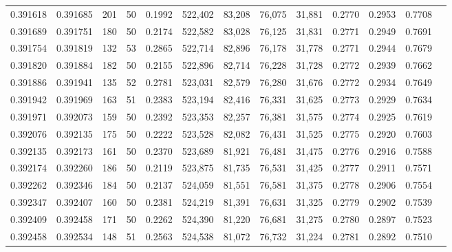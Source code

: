 \begin{tabular}{rrrrrrrrrrrrr}
0.391618 & 0.391685 &   201 &  50 &                                     0.1992 & 522,402 &  83,208 &  76,075 &  31,881 & 0.2770 & 0.2953 & 0.7708 \\
0.391689 & 0.391751 &   180 &  50 &                                     0.2174 & 522,582 &  83,028 &  76,125 &  31,831 & 0.2771 & 0.2949 & 0.7691 \\
0.391754 & 0.391819 &   132 &  53 &                                     0.2865 & 522,714 &  82,896 &  76,178 &  31,778 & 0.2771 & 0.2944 & 0.7679 \\
0.391820 & 0.391884 &   182 &  50 &                                     0.2155 & 522,896 &  82,714 &  76,228 &  31,728 & 0.2772 & 0.2939 & 0.7662 \\
0.391886 & 0.391941 &   135 &  52 &                                     0.2781 & 523,031 &  82,579 &  76,280 &  31,676 & 0.2772 & 0.2934 & 0.7649 \\
0.391942 & 0.391969 &   163 &  51 &                                     0.2383 & 523,194 &  82,416 &  76,331 &  31,625 & 0.2773 & 0.2929 & 0.7634 \\
0.391971 & 0.392073 &   159 &  50 &                                     0.2392 & 523,353 &  82,257 &  76,381 &  31,575 & 0.2774 & 0.2925 & 0.7619 \\
0.392076 & 0.392135 &   175 &  50 &                                     0.2222 & 523,528 &  82,082 &  76,431 &  31,525 & 0.2775 & 0.2920 & 0.7603 \\
0.392135 & 0.392173 &   161 &  50 &                                     0.2370 & 523,689 &  81,921 &  76,481 &  31,475 & 0.2776 & 0.2916 & 0.7588 \\
0.392174 & 0.392260 &   186 &  50 &                                     0.2119 & 523,875 &  81,735 &  76,531 &  31,425 & 0.2777 & 0.2911 & 0.7571 \\
0.392262 & 0.392346 &   184 &  50 &                                     0.2137 & 524,059 &  81,551 &  76,581 &  31,375 & 0.2778 & 0.2906 & 0.7554 \\
0.392347 & 0.392407 &   160 &  50 &                                     0.2381 & 524,219 &  81,391 &  76,631 &  31,325 & 0.2779 & 0.2902 & 0.7539 \\
0.392409 & 0.392458 &   171 &  50 &                                     0.2262 & 524,390 &  81,220 &  76,681 &  31,275 & 0.2780 & 0.2897 & 0.7523 \\
0.392458 & 0.392534 &   148 &  51 &                                     0.2563 & 524,538 &  81,072 &  76,732 &  31,224 & 0.2781 & 0.2892 & 0.7510 \\

\end{tabular}
